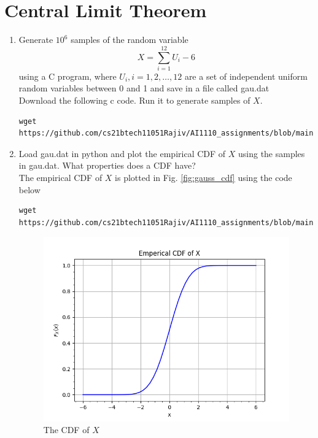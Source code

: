 \documentclass[journal,12pt,twocolumn]{IEEEtran}
\renewcommand\thesection{\arabic{section}}
\begin{document}
\section{Central Limit Theorem}
%
\begin{enumerate}[label=\thesection.\arabic*
,ref=\thesection.\theenumi]
%
\item
Generate $10^6$ samples of the random variable
%
\begin{equation}
X = \sum_{i=1}^{12}U_i -6
\end{equation}
%
using a C program, where $U_i, i = 1,2,\dots, 12$ are  a set of independent uniform random variables between 0 and 1
and save in a file called gau.dat
\\
\solution Download the following c code. Run it to generate samples of $X$.
\begin{lstlisting}
wget https://github.com/cs21btech11051Rajiv/AI1110_assignments/blob/main/manual1/q1/2p1.c
\end{lstlisting}
%
\item
Load gau.dat in python and plot the empirical CDF of $X$ using the samples in gau.dat. What properties does a CDF have?
\\
\solution The empirical CDF of $X$ is plotted in Fig. \ref{fig:gauss_cdf} using the code below
\begin{lstlisting}
wget https://github.com/cs21btech11051Rajiv/AI1110_assignments/blob/main/manual1/q1/2p2.py
\end{lstlisting}
\begin{figure}[ht!]
\centering
\includegraphics[width=\columnwidth]{./figs/fig2.2.png}
\caption{The CDF of $X$}

\end{figure}
\end{enumerate}
\end{document}
